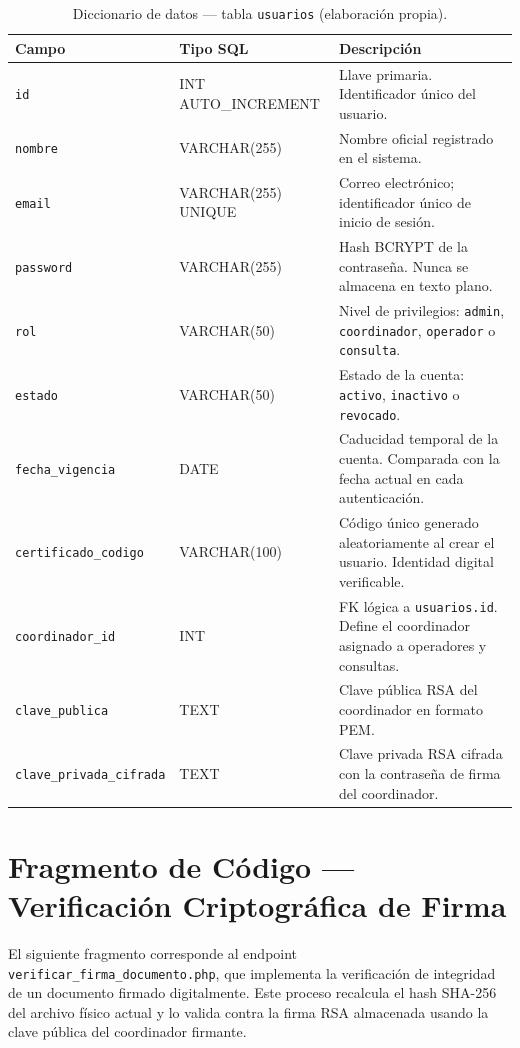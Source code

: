 \documentclass[10pt,letterpaper]{report}
\begin{document}
\begin{table}[H]
\centering
\caption{Diccionario de datos — tabla \texttt{usuarios} (elaboración propia).}
\label{tab:diccionario}
\begin{tabular}{p{} p{} p{}}
\toprule
\textbf{Campo} & \textbf{Tipo SQL} & \textbf{Descripción} \\
\midrule
\texttt{id} & INT AUTO\_INCREMENT & Llave primaria. Identificador único del usuario. \\
\texttt{nombre} & VARCHAR(255) & Nombre oficial registrado en el sistema. \\
\texttt{email} & VARCHAR(255) UNIQUE & Correo electrónico; identificador único de inicio de sesión. \\
\texttt{password} & VARCHAR(255) & Hash BCRYPT de la contraseña. Nunca se almacena en texto plano. \\
\texttt{rol} & VARCHAR(50) & Nivel de privilegios: \texttt{admin}, \texttt{coordinador}, \texttt{operador} o \texttt{consulta}. \\
\texttt{estado} & VARCHAR(50) & Estado de la cuenta: \texttt{activo}, \texttt{inactivo} o \texttt{revocado}. \\
\texttt{fecha\_vigencia} & DATE & Caducidad temporal de la cuenta. Comparada con la fecha actual en cada autenticación. \\
\texttt{certificado\_codigo} & VARCHAR(100) & Código único generado aleatoriamente al crear el usuario. Identidad digital verificable. \\
\texttt{coordinador\_id} & INT & FK lógica a \texttt{usuarios.id}. Define el coordinador asignado a operadores y consultas. \\
\texttt{clave\_publica} & TEXT & Clave pública RSA del coordinador en formato PEM. \\
\texttt{clave\_privada\_cifrada} & TEXT & Clave privada RSA cifrada con la contraseña de firma del coordinador. \\
\bottomrule
\end{tabular}
\end{table}

\chapter{Fragmento de Código — Verificación Criptográfica de Firma}
\label{anx:codigo}

El siguiente fragmento corresponde al endpoint \texttt{verificar\_firma\_documento.php}, que implementa la verificación de integridad de un documento firmado digitalmente. Este proceso recalcula el hash SHA-256 del archivo físico actual y lo valida contra la firma RSA almacenada usando la clave pública del coordinador firmante.
\end{document}
